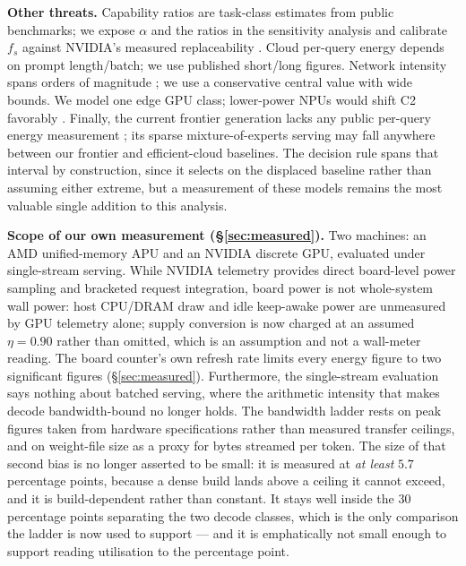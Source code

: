 \documentclass[conference]{IEEEtran}
\newcommand{\fs}{f_{s}}
\begin{document}
\textbf{Other threats.} Capability ratios are task-class estimates from public
benchmarks; we expose $\alpha$ and the ratios in the sensitivity analysis and
calibrate $\fs$ against NVIDIA's measured replaceability \cite{belcak2025}. Cloud
per-query energy depends on prompt length/batch; we use published short/long
figures. Network intensity spans orders of magnitude \cite{aslan2018}; we use a
conservative central value with wide bounds. We model one edge GPU class;
lower-power NPUs would shift C2 favorably \cite{techtarget2025}. Finally, the
current frontier generation lacks any public per-query energy measurement
\cite{frontier2026,anthropic_pricing2026,google_pricing2026,openweights2026}; its sparse mixture-of-experts serving may fall anywhere
between our frontier and efficient-cloud baselines. The decision rule spans that
interval by construction, since it selects on the displaced baseline rather than
assuming either extreme, but a measurement of these models remains the most
valuable single addition to this analysis.

\textbf{Scope of our own measurement (\S\ref{sec:measured}).} Two machines: an
AMD unified-memory APU and an NVIDIA discrete GPU, evaluated under single-stream
serving. While NVIDIA telemetry provides direct board-level power sampling and
bracketed request integration, board power is not whole-system wall power: host
CPU/DRAM draw and idle keep-awake power are unmeasured by GPU telemetry alone;
supply conversion is now charged at an assumed $\eta=0.90$ rather than omitted,
which is an assumption and not a wall-meter reading. The board counter's own
refresh rate limits every energy figure to two significant figures
(\S\ref{sec:measured}). Furthermore, the single-stream evaluation says nothing
about batched serving, where the arithmetic intensity that makes decode
bandwidth-bound no longer holds. The bandwidth ladder rests on peak figures
taken from hardware specifications rather than measured transfer ceilings, and
on weight-file size as a proxy for bytes streamed per token. The size of that
second bias is no longer asserted to be small: it is measured at \emph{at
least} $5.7$ percentage points, because a dense build lands above a ceiling it
cannot exceed, and it is build-dependent rather than constant. It stays well
inside the $30$ percentage points separating the two decode classes, which is
the only comparison the ladder is now used to support --- and it is
emphatically not small enough to support reading utilisation to the
percentage point.
\end{document}
